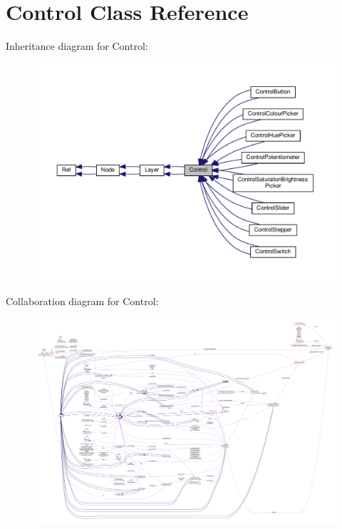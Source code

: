 \hypertarget{classControl}{}\section{Control Class Reference}
\label{classControl}


Inheritance diagram for Control\+:
\nopagebreak
\begin{figure}[H]
\begin{center}
\leavevmode
\includegraphics[width=350pt]{classControl__inherit__graph}
\end{center}
\end{figure}


Collaboration diagram for Control\+:
\nopagebreak
\begin{figure}[H]
\begin{center}
\leavevmode
\includegraphics[width=350pt]{classControl__coll__graph}
\end{center}
\end{figure}
